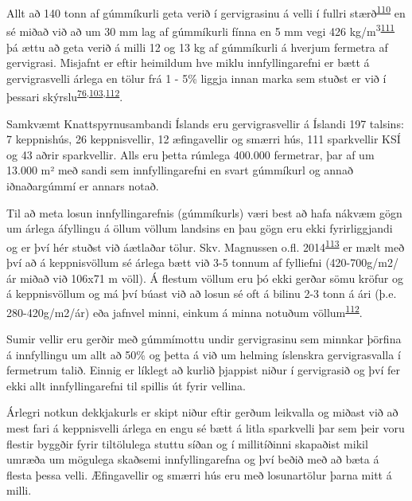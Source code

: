 \documentclass[icelandic,]{book}
\begin{document}
Allt að 140 tonn af gúmmíkurli geta verið í gervigrasinu á velli í fullri stærð\textsuperscript{\protect\hyperlink{ref-Wredh2014}{110}} en sé miðað við að um 30 mm lag af gúmmíkurli fínna en 5 mm vegi 426 kg/m\textsuperscript{3}\textsuperscript{\protect\hyperlink{ref-Gamalath2016}{111}} þá ættu að geta verið á milli 12 og 13 kg af gúmmíkurli á hverjum fermetra af gervigrasi. Misjafnt er eftir heimildum hve miklu innfyllingarefni er bætt á gervigrasvelli árlega en tölur frá 1 - 5\% liggja innan marka sem stuðst er við í þessari skýrslu\textsuperscript{\protect\hyperlink{ref-lassen2015microplastics}{76},\protect\hyperlink{ref-Hann2018}{103},\protect\hyperlink{ref-magnusson2016swedish}{112}}.

Samkvæmt Knattspyrnusambandi Íslands eru gervigrasvellir á Íslandi 197 talsins: 7 keppnishús, 26 keppnisvellir, 12 æfingavellir og smærri hús, 111 sparkvellir KSÍ og 43 aðrir sparkvellir. Alls eru þetta rúmlega 400.000 fermetrar, þar af um 13.000 m² með sandi sem innfyllingarefni en svart gúmmíkurl og annað iðnaðargúmmí er annars notað.

Til að meta losun innfyllingarefnis (gúmmíkurls) væri best að hafa nákvæm gögn um árlega áfyllingu á öllum völlum landsins en þau gögn eru ekki fyrirliggjandi og er því hér stuðst við áætlaðar tölur. Skv. Magnussen o.fl. 2014\textsuperscript{\protect\hyperlink{ref-magnusson2014mikroskrap}{113}} er mælt með því að á keppnisvöllum sé árlega bætt við 3-5 tonnum af fylliefni (420-700g/m2/ár miðað við 106x71 m völl). Á flestum völlum eru þó ekki gerðar sömu kröfur og á keppnisvöllum og má því búast við að losun sé oft á bilinu 2-3 tonn á ári (þ.e. 280-420g/m2/ár) eða jafnvel minni, einkum á minna notuðum völlum\textsuperscript{\protect\hyperlink{ref-magnusson2016swedish}{112}}.

Sumir vellir eru gerðir með gúmmímottu undir gervigrasinu sem minnkar þörfina á innfyllingu um allt að 50\% og þetta á við um helming íslenskra gervigrasvalla í fermetrum talið. Einnig er líklegt að kurlið þjappist niður í gervigrasið og því fer ekki allt innfyllingarefni til spillis út fyrir vellina.

Árlegri notkun dekkjakurls er skipt niður eftir gerðum leikvalla og miðast við að mest fari á keppnisvelli árlega en engu sé bætt á litla sparkvelli þar sem þeir voru flestir byggðir fyrir tiltölulega stuttu síðan og í millitíðinni skapaðist mikil umræða um mögulega skaðsemi innfyllingarefna og því beðið með að bæta á flesta þessa velli. Æfingavellir og smærri hús eru með losunartölur þarna mitt á milli.
\end{document}
